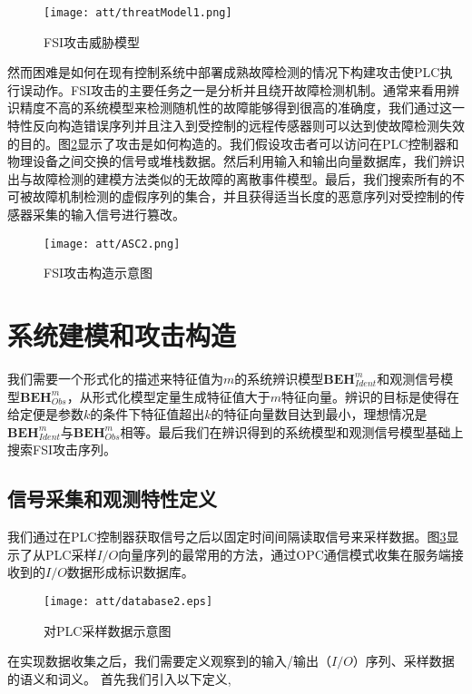 \begin{figure}[!htb]
  \centering
  \texttt{[image: att/threatModel1.png]}
  \caption{FSI攻击威胁模型}
  \label{fig1}
\end{figure}

然而困难是如何在现有控制系统中部署成熟故障检测的情况下构建攻击使PLC执行误动作。FSI攻击的主要任务之一是分析并且绕开故障检测机制。通常来看用辨识精度不高的系统模型来检测随机性的故障能够得到很高的准确度，我们通过这一特性反向构造错误序列并且注入到受控制的远程传感器则可以达到使故障检测失效的目的。图\ref {fig2}显示了攻击是如何构造的。我们假设攻击者可以访问在PLC控制器和物理设备之间交换的信号或堆栈数据。然后利用输入和输出向量数据库，我们辨识出与故障检测的建模方法类似的无故障的离散事件模型。最后，我们搜索所有的不可被故障机制检测的虚假序列的集合，并且获得适当长度的恶意序列对受控制的传感器采集的输入信号进行篡改。

\begin{figure}[!htb]
  \centering
  \texttt{[image: att/ASC2.png]}
  \caption{FSI攻击构造示意图}
  \label{fig2}
\end{figure}

\section{系统建模和攻击构造}
\label{sec:model}

我们需要一个形式化的描述来特征值为$m$的系统辨识模型$ \textbf{BEH}_{Ident}^m $和观测信号模型\( \textbf{BEH}_{Obs}^m \)，从形式化模型定量生成特征值大于$m$特征向量。辨识的目标是使得在给定便是参数$k$的条件下特征值超出$k$的特征向量数目达到最小，理想情况是$ \textbf{BEH}_{Ident}^m $与$\textbf{BEH}_{Obs}^m $相等。最后我们在辨识得到的系统模型和观测信号模型基础上搜索FSI攻击序列。

\subsection{信号采集和观测特性定义}

我们通过在PLC控制器获取信号之后以固定时间间隔读取信号来采样数据\parencite {roth2012}。图\ref {fig3}显示了从PLC采样$I/O$向量序列的最常用的方法，通过OPC通信模式收集在服务端接收到的$I/O$数据形成标识数据库。

\begin{figure}[!htb]
  \centering
  \texttt{[image: att/database2.eps]}
  \caption{对PLC采样数据示意图}
  \label{fig3}
\end{figure}

在实现数据收集之后，我们需要定义观察到的输入/输出（$I/O$）序列、采样数据的语义和词义。 首先我们引入以下定义,

